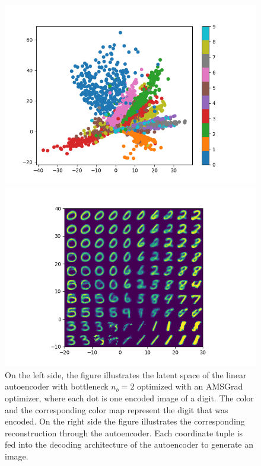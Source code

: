 \begin{figure}
\begin{center}
   \begin{minipage}[b]{0.49\linewidth}
      \includegraphics[trim = 15mm 5mm 15mm 10mm, clip, width=\linewidth]{linear_AE_2d_amsgrad_latent}
	\end{minipage}
	\begin{minipage}[b]{0.49\linewidth}
      \includegraphics[trim = 15mm 5mm 15mm 10mm, clip, width=\linewidth]{linear_AE_2d_amsgrad_reconstruction}
	\end{minipage}
\end{center}
\caption{On the left side, the figure illustrates the latent space of the linear autoencoder with bottleneck $n_b=2$ optimized with an AMSGrad optimizer, where each dot is one encoded image of a digit. The color and the corresponding color map represent the digit that was encoded. On the right side the figure illustrates the corresponding reconstruction through the autoencoder. Each coordinate tuple is fed into the decoding architecture of the autoencoder to generate an image.}\label{fig:linear_AE_2d_amsgrad_latent}
\end{figure}


